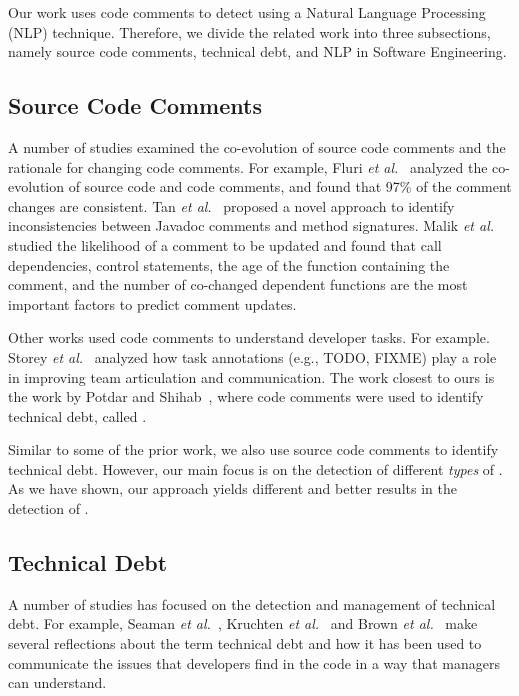 Our work uses code comments to detect \SATD using a Natural Language Processing (NLP) technique. Therefore, we divide the related work into three subsections, namely source code comments, technical debt, and NLP in Software Engineering.

\subsection{Source Code Comments}

A number of studies examined the co-evolution of source code comments and the rationale for changing code comments. For example, Fluri \textit{et al.}~\cite{Fluri2007WCRE} analyzed the co-evolution of source code and code comments, and found that 97\% of the comment changes are consistent. Tan \textit{et al.}~\cite{Tan2012ICST} proposed a novel approach to identify inconsistencies between Javadoc comments and method signatures. Malik \textit{et al.} \cite{Malik2008ICSM} studied the likelihood of a comment to be updated and found that call dependencies, control statements, the age of the function containing the comment, and the number of co-changed dependent functions are the most important factors to predict comment updates.

Other works used code comments to understand developer tasks. For example. Storey \textit{et al.}~\cite{Storey2008ICSE} analyzed how task annotations (e.g., TODO, FIXME) play a role in improving team articulation and communication. The work closest to ours is the work by Potdar and Shihab~\cite{Potdar2014ICSME}, where code comments were used to identify technical debt, called \SATD. 

Similar to some of the prior work, we also use source code comments to identify technical debt. However, our main focus is on the detection of different \emph{types} of \SATD. As we have shown, our approach yields different and better results in the detection of \SATD.

\subsection{Technical Debt}

A number of studies has focused on the detection and management of technical debt. For example, Seaman \textit{et al.}~\cite{Seaman2011}, Kruchten \textit{et al.}~\cite{Kruchten2013IWMTD} and Brown \textit{et al.}~\cite{Brown2010MTD} make several reflections about the term technical debt and how it has been used to communicate the issues that developers find in the code in a way that managers can understand. 

